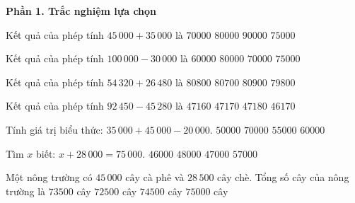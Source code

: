 \textbf{Phần 1. Trắc nghiệm lựa chọn}

\begin{ex} %
Kết quả của phép tính $45\,000 + 35\,000$ là
\choice
{$70000$}
{\True $80000$}
{$90000$}
{$75000$}
\end{ex}

\begin{ex} %
Kết quả của phép tính $100\,000 - 30\,000$ là
\choice
{$60000$}
{$80000$}
{\True $70000$}
{$75000$}
\end{ex}

\begin{ex} %
Kết quả của phép tính $54\,320 + 26\,480$ là
\choice
{\True $80800$}
{$80700$}
{$80900$}
{$79800$}
\end{ex}

\begin{ex} %
Kết quả của phép tính $92\,450 - 45\,280$ là
\choice
{$47160$}
{\True $47170$}
{$47180$}
{$46170$}
\end{ex}

\begin{ex} %
Tính giá trị biểu thức: $35\,000 + 45\,000 - 20\,000$.
\choice
{$50000$}
{$70000$}
{$55000$}
{\True $60000$}
\end{ex}

\begin{ex} %
Tìm $x$ biết: $x + 28\,000 = 75\,000$.
\choice
{$46000$}
{$48000$}
{\True $47000$}
{$57000$}
\end{ex}

\begin{ex} %
Một nông trường có $45\,000\text{ cây}$ cà phê và $28\,500\text{ cây}$ chè. Tổng số cây của nông trường là
\choice
{\True $73500$ cây}
{$72500$ cây}
{$74500$ cây}
{$75000$ cây}
\end{ex}

